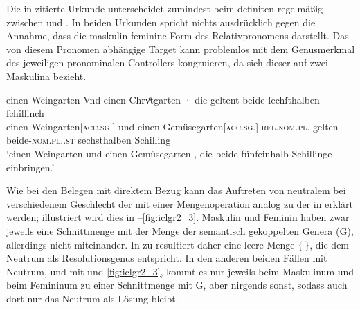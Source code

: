 Die in  zitierte Urkunde unterscheidet zumindest beim
definiten  regelmäßig zwischen  und
. In beiden Urkunden spricht nichts ausdrücklich gegen die Annahme,
dass  die maskulin-feminine Form des Relativpronomens darstellt. Das
von diesem Pronomen abhängige Target  kann problemlos mit dem
Genusmerkmal des jeweiligen pronominalen Controllers
kongruieren, da sich dieser auf zwei Maskulina bezieht.

\begin{exe}
\ex \label{ex:m+m_inan_e3}
	\gll einen Weingarten \textelp{} Vnd einen Chrvͦtgarten \textelp{} ·
			die geltent beide ſechſthalben ſchillinch \\
		einen Weingarten[\textsc{acc.sg.\MascI}] {} und einen
			Gemüsegarten[\textsc{acc.sg.\MascI}] {} {}
			\textsc{rel.nom.pl.\MascI} gelten
			beide-\textsc{nom.pl.\MascI.st} sechsthalben Schilling \\
	\trans `einen Weingarten \textelp{} und einen Gemüsegarten \textelp{},
		die beide fünfeinhalb Schillinge \textelp{} einbringen.'
		\parencites(Nr.~2396, Regensburg, 1296)[484,28--30]{cao3}
\end{exe}

Wie bei den Belegen mit direktem Bezug kann das Auftreten von neutralem
 bei verschiedenem Geschlecht der  mit einer
Mengenoperation analog zu der in  erklärt werden; illustriert
wird dies in --\ref{fig:iclgr2_3}. Maskulin und Feminin
haben zwar jeweils eine Schnittmenge mit der Menge der semantisch gekoppelten
Genera (G), allerdings nicht miteinander. In
 zu  resultiert daher eine leere Menge
$\{\ \}$, die dem Neutrum als Resolutionsgenus
entspricht. In den anderen beiden Fällen mit Neutrum,  und
 mit  und \ref{fig:iclgr2_3}, kommt es
nur jeweils beim Maskulinum und beim Femininum zu einer Schnittmenge mit
G, aber nirgends sonst, sodass auch dort nur das Neutrum als Lösung
bleibt.


